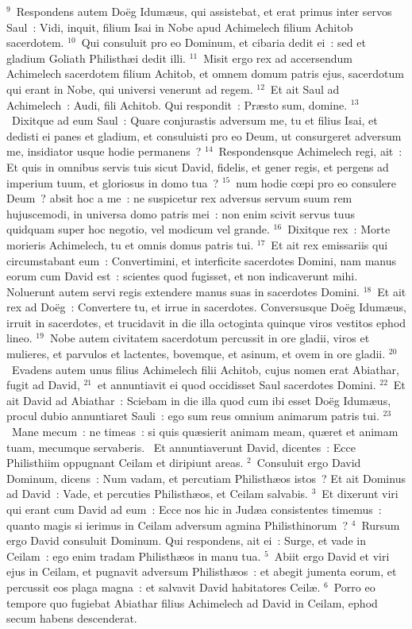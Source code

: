 ${}^{9}$~Respondens autem Do\"eg Idum\ae us, qui assistebat, et erat primus inter servos Saul~: Vidi, inquit, filium Isai in Nobe apud Achimelech filium Achitob sacerdotem.
${}^{10}$~Qui consuluit pro eo Dominum, et cibaria dedit ei~: sed et gladium Goliath Philisth\ae i dedit illi.
${}^{11}$~Misit ergo rex ad accersendum Achimelech sacerdotem filium Achitob, et omnem domum patris ejus, sacerdotum qui erant in Nobe, qui universi venerunt ad regem.
${}^{12}$~Et ait Saul ad Achimelech~: Audi, fili Achitob. Qui respondit~: Pr\ae sto sum, domine.
${}^{13}$~Dixitque ad eum Saul~: Quare conjurastis adversum me, tu et filius Isai, et dedisti ei panes et gladium, et consuluisti pro eo Deum, ut consurgeret adversum me, insidiator usque hodie permanens~?
${}^{14}$~Respondensque Achimelech regi, ait~: Et quis in omnibus servis tuis sicut David, fidelis, et gener regis, et pergens ad imperium tuum, et gloriosus in domo tua~?
${}^{15}$~num hodie cœpi pro eo consulere Deum~? absit hoc a me~: ne suspicetur rex adversus servum suum rem hujuscemodi, in universa domo patris mei~: non enim scivit servus tuus quidquam super hoc negotio, vel modicum vel grande.
${}^{16}$~Dixitque rex~: Morte morieris Achimelech, tu et omnis domus patris tui.
${}^{17}$~Et ait rex emissariis qui circumstabant eum~: Convertimini, et interficite sacerdotes Domini, nam manus eorum cum David est~: scientes quod fugisset, et non indicaverunt mihi. Noluerunt autem servi regis extendere manus suas in sacerdotes Domini.
${}^{18}$~Et ait rex ad Do\"eg~: Convertere tu, et irrue in sacerdotes. Conversusque Do\"eg Idum\ae us, irruit in sacerdotes, et trucidavit in die illa octoginta quinque viros vestitos ephod lineo.
${}^{19}$~Nobe autem civitatem sacerdotum percussit in ore gladii, viros et mulieres, et parvulos et lactentes, bovemque, et asinum, et ovem in ore gladii.
${}^{20}$~Evadens autem unus filius Achimelech filii Achitob, cujus nomen erat Abiathar, fugit ad David,
${}^{21}$~et annuntiavit ei quod occidisset Saul sacerdotes Domini.
${}^{22}$~Et ait David ad Abiathar~: Sciebam in die illa quod cum ibi esset Do\"eg Idum\ae us, procul dubio annuntiaret Sauli~: ego sum reus omnium animarum patris tui.
${}^{23}$~Mane mecum~: ne timeas~: si quis qu\ae sierit animam meam, qu\ae ret et animam tuam, mecumque servaberis.
~Et annuntiaverunt David, dicentes~: Ecce Philisthiim oppugnant Ceilam et diripiunt areas.
${}^{2}$~Consuluit ergo David Dominum, dicens~: Num vadam, et percutiam Philisth\ae os istos~? Et ait Dominus ad David~: Vade, et percuties Philisth\ae os, et Ceilam salvabis.
${}^{3}$~Et dixerunt viri qui erant cum David ad eum~: Ecce nos hic in Jud\ae a consistentes timemus~: quanto magis si ierimus in Ceilam adversum agmina Philisthinorum~?
${}^{4}$~Rursum ergo David consuluit Dominum. Qui respondens, ait ei~: Surge, et vade in Ceilam~: ego enim tradam Philisth\ae os in manu tua.
${}^{5}$~Abiit ergo David et viri ejus in Ceilam, et pugnavit adversum Philisth\ae os~: et abegit jumenta eorum, et percussit eos plaga magna~: et salvavit David habitatores Ceil\ae .
${}^{6}$~Porro eo tempore quo fugiebat Abiathar filius Achimelech ad David in Ceilam, ephod secum habens descenderat.


